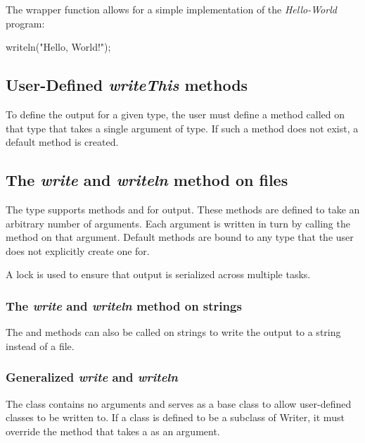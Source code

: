 \begin{example}
The  wrapper function allows for a simple implementation
of the {\em Hello-World} program:
\begin{chapel}
writeln("Hello, World!");
\end{chapel}
\end{example}

\subsection{User-Defined {\em writeThis} methods}

To define the output for a given type, the user must define a method
called  on that type that takes a single argument of
 type.  If such a method does not exist, a default method is
created.

\subsection{The {\em write} and {\em writeln} method on files}
\label{filewrite}

The  type supports methods  and 
for output.  These methods are defined to take an arbitrary number of
arguments.  Each argument is written in turn by calling
the  method on that argument.
Default  methods are bound to any type that the user
does not explicitly create one for.

A lock is used to ensure that output is serialized across multiple
tasks.

\subsubsection{The {\em write} and {\em writeln} method on strings}
\label{stringwrite}

The  and  methods can also be called on
strings to write the output to a string instead of a file.

\subsubsection{Generalized {\em write} and {\em writeln}}
\label{writer}

The  class contains no arguments and serves as a base
class to allow user-defined classes to be written to.  If a class is
defined to be a subclass of Writer, it must override
the  method that takes a  as an argument.

